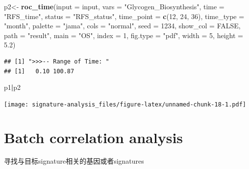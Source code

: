 \documentclass[
  12pt,
]{book}
\newenvironment{Shaded}{\begin{snugshade}}{\end{snugshade}}
\newcommand{\AttributeTok}[1]{\textcolor[rgb]{0.13,0.29,0.53}{#1}}
\newcommand{\ConstantTok}[1]{\textcolor[rgb]{0.56,0.35,0.01}{#1}}
\newcommand{\DecValTok}[1]{\textcolor[rgb]{0.00,0.00,0.81}{#1}}
\newcommand{\FloatTok}[1]{\textcolor[rgb]{0.00,0.00,0.81}{#1}}
\newcommand{\FunctionTok}[1]{\textcolor[rgb]{0.13,0.29,0.53}{\textbf{#1}}}
\newcommand{\NormalTok}[1]{#1}
\newcommand{\OtherTok}[1]{\textcolor[rgb]{0.56,0.35,0.01}{#1}}
\newcommand{\SpecialCharTok}[1]{\textcolor[rgb]{0.81,0.36,0.00}{\textbf{#1}}}
\newcommand{\StringTok}[1]{\textcolor[rgb]{0.31,0.60,0.02}{#1}}
\begin{document}
\begin{Shaded}
\begin{Highlighting}[]
\NormalTok{p2}\OtherTok{\textless{}{-}} \FunctionTok{roc\_time}\NormalTok{(}\AttributeTok{input      =}\NormalTok{ input,  }
             \AttributeTok{vars       =} \StringTok{"Glycogen\_Biosynthesis"}\NormalTok{, }
             \AttributeTok{time       =} \StringTok{"RFS\_time"}\NormalTok{,}
             \AttributeTok{status     =} \StringTok{"RFS\_status"}\NormalTok{, }
             \AttributeTok{time\_point =} \FunctionTok{c}\NormalTok{(}\DecValTok{12}\NormalTok{, }\DecValTok{24}\NormalTok{, }\DecValTok{36}\NormalTok{), }
             \AttributeTok{time\_type  =} \StringTok{"month"}\NormalTok{,}
             \AttributeTok{palette    =} \StringTok{"jama"}\NormalTok{,}
             \AttributeTok{cols       =} \StringTok{"normal"}\NormalTok{,}
             \AttributeTok{seed       =} \DecValTok{1234}\NormalTok{, }
             \AttributeTok{show\_col   =} \ConstantTok{FALSE}\NormalTok{, }
             \AttributeTok{path       =} \StringTok{"result"}\NormalTok{, }
             \AttributeTok{main       =} \StringTok{"OS"}\NormalTok{,}
             \AttributeTok{index      =} \DecValTok{1}\NormalTok{,}
             \AttributeTok{fig.type   =} \StringTok{"pdf"}\NormalTok{,}
             \AttributeTok{width      =} \DecValTok{5}\NormalTok{,}
             \AttributeTok{height     =} \FloatTok{5.2}\NormalTok{)}
\end{Highlighting}
\end{Shaded}

\begin{verbatim}
## [1] ">>>-- Range of Time: "
## [1]   0.10 100.87
\end{verbatim}

\begin{Shaded}
\begin{Highlighting}[]
\NormalTok{p1}\SpecialCharTok{|}\NormalTok{p2}
\end{Highlighting}
\end{Shaded}

\texttt{[image: signature-analysis\_files/figure-latex/unnamed-chunk-18-1.pdf]}

\hypertarget{batch-correlation-analysis}{%
\section{Batch correlation analysis}\label{batch-correlation-analysis}}

寻找与目标signature相关的基因或者signatures
\end{document}
